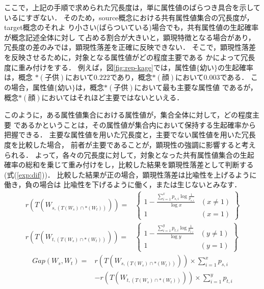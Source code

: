 ここで，上記の手順で求められた冗長度は，単に属性値のばらつき具合を示しているにすぎない．
そのため，source概念における共有属性値集合の冗長度が，target概念のそれよ
り小さい(ばらついている)場合でも，共有属性値の生起確率が概念記述全体に対し
て占める割合が大きいと，顕現特徴となる場合があり，
冗長度の差のみでは，顕現性落差を正確に反映できない．
そこで，顕現性落差を反映させるために，対象となる属性値がどの程度主要である
かによって冗長度に重み付けをする．
例えば，図\ref{fig:rep-kage}では，属性値$\{幼い\}$の生起確率は，概念
$\ast(子供)$において$0.222$であり，概念$\ast(顔)$において$0.003$である．
この場合，属性値$\{幼い\}$は，概念$\ast(子供)$において最も主要な属性値
であるが，概念$\ast(顔)$においてはそれほど主要ではないといえる．

このように，ある属性値集合における属性値が，集合全体に対して，どの程度主要
であるかということは，その属性値が集合内において保持する生起確率から把握できる．
主要な属性値を用いた冗長度と，主要でない属性値を用いた冗長度を比較した場合，
前者が主要であることが，顕現性の強調に影響すると考えられる．
よって，各々の冗長度に対して，対象となった共有属性値集合の生起
確率の総和を乗じて重み付けをし，比較した結果を顕現性落差として判断する
(式(\ref{exp:dif}))．
比較した結果が正の場合，顕現性落差は比喩性を上げるように働き，負の場合は
比喩性を下げるように働く，または生じないとみなす．
\begin{eqnarray}
\label{exp:var1}
r(T(W_{s,(T(W_s)\cap{\ast}(W_t))})) = &
   \left\{ \begin{array}{cc}
	 1 - \frac{\sum_{i=1}^{x}{{p_{s,i}}\log{\frac{1}{p_{s,i}}}}}{\log{x}}&(x{\neq}1)\\
	{1} & (x=1)
      \end{array}\right\}\\
\label{exp:var2}
r(T(W_{t,(T(W_s)\cap{\ast}(W_t))})) = &
   \left\{ \begin{array}{cc}
	 1 - \frac{\sum_{i=1}^{y}{{p_{t,i}}\log{\frac{1}{p_{t,i}}}}}{\log{y}}&(y{\neq}1)\\
	{1} & (y=1)
      \end{array}\right\}
\end{eqnarray}
\begin{eqnarray}
\label{exp:dif}
Gap(W_s,W_t) =  & 
	r(T(W_{s,(T(W_s)\cap{\ast}(W_t))}))×\sum_{i=1}^{x}{p_{s,i}} \nonumber \\
&	- r(T(W_{t,(T(W_s)\cap{\ast}(W_t))}))×\sum_{i=1}^{y}{p_{t,i}}
\end{eqnarray}

